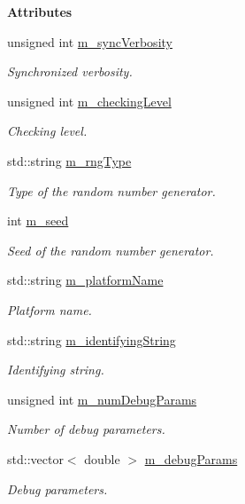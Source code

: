 \begin{Indent}{\bf Attributes}
\begin{DoxyCompactItemize}
unsigned int \hyperlink{class_q_u_e_s_o_1_1_env_options_values_a572ccae8dda30e5161c427d94d83fe34}{m\-\_\-sync\-Verbosity}
\begin{DoxyCompactList}\small\item\em Synchronized verbosity. \end{DoxyCompactList}\item 
unsigned int \hyperlink{class_q_u_e_s_o_1_1_env_options_values_a8c6ef31adcc7909b75a83cf30e698b7d}{m\-\_\-checking\-Level}
\begin{DoxyCompactList}\small\item\em Checking level. \end{DoxyCompactList}\item 
std\-::string \hyperlink{class_q_u_e_s_o_1_1_env_options_values_a01502ec46080bf43c99d55646e6a1b7f}{m\-\_\-rng\-Type}
\begin{DoxyCompactList}\small\item\em Type of the random number generator. \end{DoxyCompactList}\item 
int \hyperlink{class_q_u_e_s_o_1_1_env_options_values_adf0629a19e30b4f907b2e5fc90c9830a}{m\-\_\-seed}
\begin{DoxyCompactList}\small\item\em Seed of the random number generator. \end{DoxyCompactList}\item 
std\-::string \hyperlink{class_q_u_e_s_o_1_1_env_options_values_aaecd649e9d424572e66db71533af1913}{m\-\_\-platform\-Name}
\begin{DoxyCompactList}\small\item\em Platform name. \end{DoxyCompactList}\item 
std\-::string \hyperlink{class_q_u_e_s_o_1_1_env_options_values_a4d704b461389c12e658e1e5e811ccb18}{m\-\_\-identifying\-String}
\begin{DoxyCompactList}\small\item\em Identifying string. \end{DoxyCompactList}\item 
unsigned int \hyperlink{class_q_u_e_s_o_1_1_env_options_values_ab03e99e270e681196428683a3ad0de63}{m\-\_\-num\-Debug\-Params}
\begin{DoxyCompactList}\small\item\em Number of debug parameters. \end{DoxyCompactList}\item 
std\-::vector$<$ double $>$ \hyperlink{class_q_u_e_s_o_1_1_env_options_values_aef18abb5a1cf76c527b03342e2c2e8b1}{m\-\_\-debug\-Params}
\begin{DoxyCompactList}\small\item\em Debug parameters. \end{DoxyCompactList}\end{DoxyCompactItemize}
\end{Indent}
